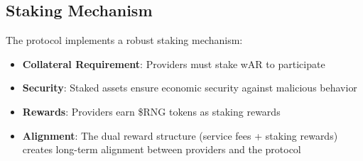 \subsection{Staking Mechanism}\label{sec:staking}
The protocol implements a robust staking mechanism:

\begin{itemize}
    \item \textbf{Collateral Requirement}: Providers must stake wAR to participate
    \item \textbf{Security}: Staked assets ensure economic security against malicious behavior
    \item \textbf{Rewards}: Providers earn \$RNG tokens as staking rewards
    \item \textbf{Alignment}: The dual reward structure (service fees + staking rewards) creates long-term alignment between providers and the protocol
\end{itemize}
